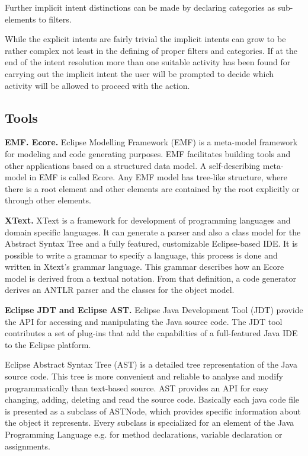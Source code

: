 Further implicit intent distinctions can be made by declaring categories as sub-elements to filters.

While the explicit intents are fairly trivial the implicit intents can grow to be rather complex not least in the defining of proper filters and categories. If at the end of the intent resolution more than one suitable activity has been found for carrying out the implicit intent the user will be prompted to decide which activity will be allowed to proceed with the action. 


\subsection{Tools}
\textbf{EMF. Ecore.} Eclipse Modelling Framework (EMF) \cite{emf} is a meta-model framework for modeling and code generating purposes. EMF facilitates building tools and other applications based on a structured data model. A self-describing meta-model in EMF is called Ecore. Any EMF model has tree-like structure, where there is a root element and other elements are contained by the root explicitly or through other elements. 

\textbf{XText.} XText \cite{xtext} is a framework for development of programming languages and domain specific languages. It can generate a parser and also a class model for the Abstract Syntax Tree and a fully featured, customizable Eclipse-based IDE. It is possible to write a grammar to specify a language, this process is done and written in Xtext's grammar language. This grammar describes how an Ecore model is derived from a textual notation. From that definition, a code generator derives an ANTLR parser and the classes for the object model.

\textbf{Eclipse JDT and Eclipse AST.} Eclipse Java Development Tool (JDT) \cite{jdt} provide the API for accessing and manipulating the Java source code. The JDT tool contributes a set of plug-ins that add the capabilities of a full-featured Java IDE to the Eclipse platform.

Eclipse Abstract Syntax Tree (AST) \cite{ast} is a detailed tree representation of the Java source code. This tree is more convenient and reliable to analyse and modify programmatically than text-based source. AST provides an API for easy changing, adding, deleting and read the source code. Basically each java code file is presented as a subclass of ASTNode, which provides specific information about the object it represents. Every subclass is specialized for an element of the Java Programming Language e.g. for method declarations, variable declaration or assignments.
